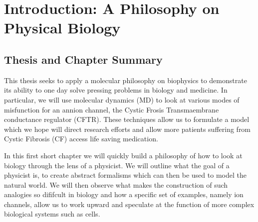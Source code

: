 \chapter{Introduction: A Philosophy on Physical Biology}
\setcounter{page}{1}
\label{chap:intro}
 {}
\vspace
\section{Thesis and Chapter Summary}
This thesis seeks to apply a molecular philosophy on biophysics to demonstrate its ability to one day solve pressing problems in biology and medicine. In particular, we will use molecular dynamics (MD) to look at various modes of misfunction for an annion channel, the Cystic Frosis Transmaembrane conductance regulator (CFTR).  These techniques allow us to formulate a model which we hope will direct research efforts and allow more patients suffering from Cystic Fibrosis (CF) access life saving medication.

In this first short chapter we will quickly build a philosophy of how to look at biology through the lens of a physicist. We will outline what the goal of a physicist is, to create abstract formalisms which can then be used to model the natural world. We will then observe what makes the construction of such analogies so dififcult in biology and how a specific set of examples, namely ion channels, allow us to work upward and speculate at the function of more complex biological systems such as cells. 

